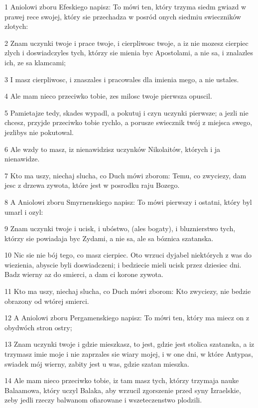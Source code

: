 \par 1 Aniolowi zboru Efeskiego napisz: To mówi ten, który trzyma siedm gwiazd w prawej rece swojej, który sie przechadza w posród onych siedmiu swieczników zlotych:
\par 2 Znam uczynki twoje i prace twoje, i cierpliwosc twoje, a iz nie mozesz cierpiec zlych i doswiadczyles tych, którzy sie mienia byc Apostolami, a nie sa, i znalazles ich, ze sa klamcami;
\par 3 I masz cierpliwosc, i znaszales i pracowales dla imienia mego, a nie ustales.
\par 4 Ale mam nieco przeciwko tobie, zes milosc twoje pierwsza opuscil.
\par 5 Pamietajze tedy, skades wypadl, a pokutuj i czyn uczynki pierwsze; a jezli nie chcesz, przyjde przeciwko tobie rychlo, a porusze swiecznik twój z miejsca swego, jezlibys nie pokutowal.
\par 6 Ale wzdy to masz, iz nienawidzisz uczynków Nikolaitów, których i ja nienawidze.
\par 7 Kto ma uszy, niechaj slucha, co Duch mówi zborom: Temu, co zwyciezy, dam jesc z drzewa zywota, które jest w posrodku raju Bozego.
\par 8 A Aniolowi zboru Smyrnenskiego napisz: To mówi pierwszy i ostatni, który byl umarl i ozyl:
\par 9 Znam uczynki twoje i ucisk, i ubóstwo, (ales bogaty), i bluznierstwo tych, którzy sie powiadaja byc Zydami, a nie sa, ale sa bóznica szatanska.
\par 10 Nic sie nie bój tego, co masz cierpiec. Oto wrzuci dyjabel niektórych z was do wiezienia, abyscie byli doswiadczeni; i bedziecie mieli ucisk przez dziesiec dni. Badz wierny az do smierci, a dam ci korone zywota.
\par 11 Kto ma uszy, niechaj slucha, co Duch mówi zborom: Kto zwyciezy, nie bedzie obrazony od wtórej smierci.
\par 12 A Aniolowi zboru Pergamenskiego napisz: To mówi ten, który ma miecz on z obydwóch stron ostry;
\par 13 Znam uczynki twoje i gdzie mieszkasz, to jest, gdzie jest stolica szatanska, a iz trzymasz imie moje i nie zaprzales sie wiary mojej, i w one dni, w które Antypas, swiadek mój wierny, zabity jest u was, gdzie szatan mieszka.
\par 14 Ale mam nieco przeciwko tobie, iz tam masz tych, którzy trzymaja nauke Balaamowa, który uczyl Balaka, aby wrzucil zgorszenie przed syny Izraelskie, zeby jedli rzeczy balwanom ofiarowane i wszeteczenstwo plodzili.
